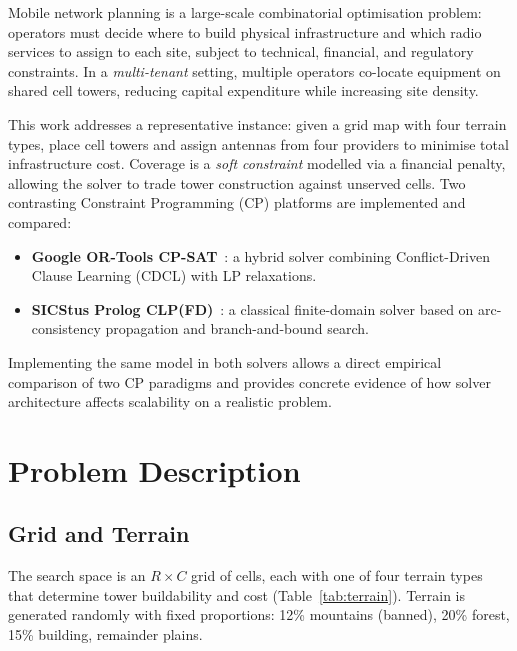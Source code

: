 \documentclass{llncs}
\begin{document}
Mobile network planning is a large-scale combinatorial optimisation problem:
operators must decide where to build physical infrastructure and which radio
services to assign to each site, subject to technical, financial, and regulatory
constraints. In a \emph{multi-tenant} setting, multiple operators co-locate
equipment on shared cell towers, reducing capital expenditure while increasing
site density.

This work addresses a representative instance: given a grid map with four
terrain types, place cell towers and assign antennas from four providers to
minimise total infrastructure cost. Coverage is a \emph{soft constraint}
modelled via a financial penalty, allowing the solver to trade tower
construction against unserved cells. Two contrasting Constraint Programming (CP)
platforms are implemented and compared:
\begin{itemize}
  \item \textbf{Google OR-Tools CP-SAT}~\cite{ortools}: a hybrid solver
        combining Conflict-Driven Clause Learning (CDCL) with LP relaxations.
  \item \textbf{SICStus Prolog CLP(FD)}~\cite{sicstus}: a classical
        finite-domain solver based on arc-consistency propagation and
        branch-and-bound search.
\end{itemize}

Implementing the same model in both solvers allows a direct empirical comparison
of two CP paradigms and provides concrete evidence of how solver architecture
affects scalability on a realistic problem.

\section{Problem Description}
\label{sec:problem}

\subsection{Grid and Terrain}

The search space is an $R{\times}C$ grid of cells, each with one of four
terrain types that determine tower buildability and cost
(Table~\ref{tab:terrain}). Terrain is generated randomly with fixed
proportions: 12\% mountains (banned), 20\% forest, 15\% building, remainder
plains.
\end{document}
